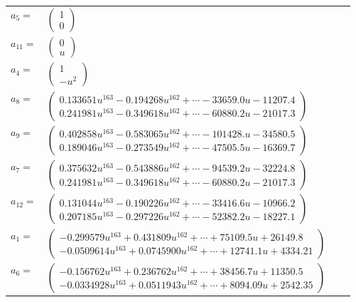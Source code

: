 \documentclass[1p]{elsarticle_modified}
\theoremstyle{definition}
\begin{document}
\begin{tabular}{m{7pt} m{180pt} m{7pt} m{180pt} }
\flushright $a_{5}=$&$\begin{pmatrix}1\\0\end{pmatrix}$ \\
\flushright $a_{11}=$&$\begin{pmatrix}0\\u\end{pmatrix}$ \\
\flushright $a_{4}=$&$\begin{pmatrix}1\\- u^2\end{pmatrix}$ \\
\flushright $a_{8}=$&$\begin{pmatrix}0.133651 u^{163}-0.194268 u^{162}+\cdots-33659.0 u-11207.4\\0.241981 u^{163}-0.349618 u^{162}+\cdots-60880.2 u-21017.3\end{pmatrix}$ \\
\flushright $a_{9}=$&$\begin{pmatrix}0.402858 u^{163}-0.583065 u^{162}+\cdots-101428. u-34580.5\\0.189046 u^{163}-0.273549 u^{162}+\cdots-47505.5 u-16369.7\end{pmatrix}$ \\
\flushright $a_{7}=$&$\begin{pmatrix}0.375632 u^{163}-0.543886 u^{162}+\cdots-94539.2 u-32224.8\\0.241981 u^{163}-0.349618 u^{162}+\cdots-60880.2 u-21017.3\end{pmatrix}$ \\
\flushright $a_{12}=$&$\begin{pmatrix}0.131044 u^{163}-0.190226 u^{162}+\cdots-33416.6 u-10966.2\\0.207185 u^{163}-0.297226 u^{162}+\cdots-52382.2 u-18227.1\end{pmatrix}$ \\
\flushright $a_{1}=$&$\begin{pmatrix}-0.299579 u^{163}+0.431809 u^{162}+\cdots+75109.5 u+26149.8\\-0.0509614 u^{163}+0.0745900 u^{162}+\cdots+12741.1 u+4334.21\end{pmatrix}$ \\
\flushright $a_{6}=$&$\begin{pmatrix}-0.156762 u^{163}+0.236762 u^{162}+\cdots+38456.7 u+11350.5\\-0.0334928 u^{163}+0.0511943 u^{162}+\cdots+8094.09 u+2542.35\end{pmatrix}$ \\

\end{tabular}
\end{document}
